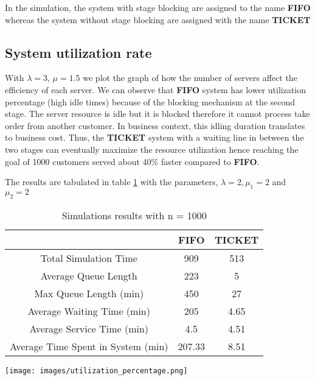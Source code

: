 In the simulation, the system with stage blocking are assigned to the name \textbf{FIFO} whereas the system without stage blocking are assigned with the name \textbf{TICKET}
\subsection{System utilization rate}
With $\lambda = 3$, $\mu = 1.5$ we plot the graph of how the number of servers affect the efficiency of each server. We can observe that \textbf{FIFO} system has lower utilization percentage (high idle times) because of the blocking mechanism at the second stage. The server resource is idle but it is blocked therefore it cannot process take order from another customer. In business context, this idling duration translates to business cost. Thus, the \textbf{TICKET} system with a waiting line in between the two stages can eventually maximize the resource utilization hence reaching the goal of 1000 customers served about 40\% faster compared to \textbf{FIFO}. 

The results are tabulated in table \ref{Tab:MainResults} with the parameters, $\lambda = 2, \mu_1 = 2 $ and $\mu_2 = 2$ 


	\begin{table}[ht]
		\caption{Simulations results with n = 1000}
		\begin{center}
 \begin{tabular}{|c|c|c|}
 	\hline
 	& \textbf{FIFO} & \textbf{TICKET}\\
 	\hline
 	Total Simulation Time & 909 & 513 \\
 	\hline
 	Average Queue Length & 223 & 5 \\
 	\hline
 	Max Queue Length (min) & 450 & 27 \\
 	\hline
 	Average Waiting Time (min) & 205 & 4.65 \\
 	\hline
 	Average Service Time (min) & 4.5 & 4.51 \\
 	\hline
 	Average Time Spent in System (min) & 207.33 & 8.51 \\
 	\hline
 \end{tabular}
\label{Tab:MainResults}
\end{center}
\end{table}

\noindent
\begin{minipage}{\textwidth}
    \texttt{[image: images/utilization\_percentage.png]}
    \label{utilization_percentage}
\end{minipage}

